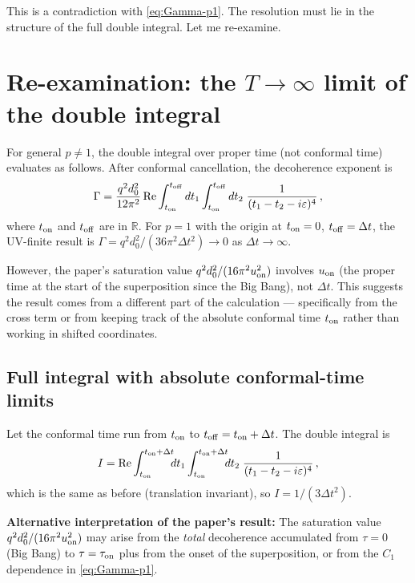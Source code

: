 \documentclass[12pt]{article}
\begin{document}
This is a contradiction with \eqref{eq:Gamma-p1}.  The resolution must lie in the
structure of the full double integral.  Let me re-examine.

\section*{Re-examination: the $T\to\infty$ limit of the double integral}

For general $p\neq 1$, the double integral over proper time (not conformal time)
evaluates as follows.  After conformal cancellation, the decoherence exponent is
%
\begin{equation}
  \Gamma = \frac{q^{2}d_{0}^{2}}{12\pi^{2}}
  \,\mathrm{Re}\int_{t_{\rm on}}^{t_{\rm off}}dt_{1}\int_{t_{\rm on}}^{t_{\rm off}}dt_{2}\;
  \frac{1}{(t_{1}-t_{2}-i\varepsilon)^{4}} \,,
\end{equation}
%
where $t_{\rm on}$ and $t_{\rm off}$ are in $\mathbb{R}$.  For $p=1$ with the origin
at $t_{\rm on}=0$, $t_{\rm off}=\Delta t$, the UV-finite result is
$\Gamma = q^{2}d_{0}^{2}/(36\pi^{2}\Delta t^{2})\to 0$ as $\Delta t\to\infty$.

However, the paper's saturation value $q^{2}d_{0}^{2}/(16\pi^{2}u_{\rm on}^{2})$
involves $u_{\rm on}$ (the proper time at the start of the superposition since the
Big Bang), not $\Delta t$.  This suggests the result comes from a different part of
the calculation — specifically from the cross term or from keeping track of the
absolute conformal time $t_{\rm on}$ rather than working in shifted coordinates.

\subsection*{Full integral with absolute conformal-time limits}

Let the conformal time run from $t_{\rm on}$ to $t_{\rm off} = t_{\rm on}+\Delta t$.
The double integral is
%
\begin{equation}
  I = \mathrm{Re}\int_{t_{\rm on}}^{t_{\rm on}+\Delta t}\!\!\!dt_{1}
  \int_{t_{\rm on}}^{t_{\rm on}+\Delta t}\!\!\!dt_{2}\;
  \frac{1}{(t_{1}-t_{2}-i\varepsilon)^{4}} \,,
\end{equation}
%
which is the same as before (translation invariant), so $I = 1/(3\Delta t^{2})$.

\medskip
\noindent\textbf{Alternative interpretation of the paper's result:}
The saturation value $q^{2}d_{0}^{2}/(16\pi^{2}u_{\rm on}^{2})$ may arise from
the \emph{total} decoherence accumulated from $\tau=0$ (Big Bang) to $\tau=\tau_{\rm on}$
plus from the onset of the superposition, or from the $C_{1}$ dependence in
\eqref{eq:Gamma-p1}.
\end{document}
